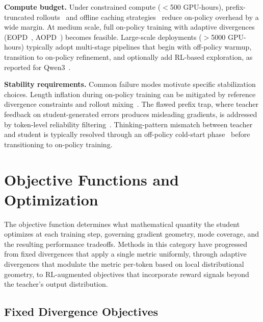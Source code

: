 \documentclass{article} %
\begin{document}
\textbf{Compute budget.} Under constrained compute ($<$500 GPU-hours), prefix-truncated rollouts~\citep{2602.15260} and offline caching strategies~\citep{2604.13010} reduce on-policy overhead by a wide margin. At medium scale, full on-policy training with adaptive divergences (EOPD~\citep{2603.07079}, AOPD~\citep{2605.06387}) becomes feasible. Large-scale deployments ($>$5000 GPU-hours) typically adopt multi-stage pipelines that begin with off-policy warmup, transition to on-policy refinement, and optionally add RL-based exploration, as reported for Qwen3~\citep{2505.09388}.

\textbf{Stability requirements.} Common failure modes motivate specific stabilization choices. Length inflation during on-policy training can be mitigated by reference divergence constraints and rollout mixing~\citep{2604.08527}. The flawed prefix trap, where teacher feedback on student-generated errors produces misleading gradients, is addressed by token-level reliability filtering~\citep{2604.14084,2604.10688}. Thinking-pattern mismatch between teacher and student is typically resolved through an off-policy cold-start phase~\citep{2604.13016} before transitioning to on-policy training.

\section{Objective Functions and Optimization}
\label{sec:objectives}

The objective function determines what mathematical quantity the student optimizes at each training step, governing gradient geometry, mode coverage, and the resulting performance tradeoffs. Methods in this category have progressed from fixed divergences that apply a single metric uniformly, through adaptive divergences that modulate the metric per-token based on local distributional geometry, to RL-augmented objectives that incorporate reward signals beyond the teacher's output distribution.

\subsection{Fixed Divergence Objectives}
\label{subsec:fixed_div}
\end{document}
